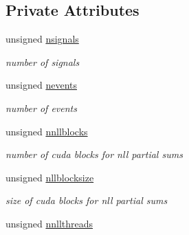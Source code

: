 \subsection*{Private Attributes}
\begin{DoxyCompactItemize}
\item 
\hypertarget{classMCMC_a417ddd0a6fdee2ea401d3d1ac727171a}{
unsigned \hyperlink{classMCMC_a417ddd0a6fdee2ea401d3d1ac727171a}{nsignals}}
\label{classMCMC_a417ddd0a6fdee2ea401d3d1ac727171a}

\begin{DoxyCompactList}\small\item\em number of signals \item\end{DoxyCompactList}\item 
\hypertarget{classMCMC_a65d836666d35f0c4ffb3f94b84082cbc}{
unsigned \hyperlink{classMCMC_a65d836666d35f0c4ffb3f94b84082cbc}{nevents}}
\label{classMCMC_a65d836666d35f0c4ffb3f94b84082cbc}

\begin{DoxyCompactList}\small\item\em number of events \item\end{DoxyCompactList}\item 
\hypertarget{classMCMC_a1da299776614208fe3cbd4b3e7dad36e}{
unsigned \hyperlink{classMCMC_a1da299776614208fe3cbd4b3e7dad36e}{nnllblocks}}
\label{classMCMC_a1da299776614208fe3cbd4b3e7dad36e}

\begin{DoxyCompactList}\small\item\em number of cuda blocks for nll partial sums \item\end{DoxyCompactList}\item 
\hypertarget{classMCMC_a52384b7e58b83ab2abd279071b08ad84}{
unsigned \hyperlink{classMCMC_a52384b7e58b83ab2abd279071b08ad84}{nllblocksize}}
\label{classMCMC_a52384b7e58b83ab2abd279071b08ad84}

\begin{DoxyCompactList}\small\item\em size of cuda blocks for nll partial sums \item\end{DoxyCompactList}\item 
\hypertarget{classMCMC_af09948388cb5534d9a563a943979eecd}{
unsigned \hyperlink{classMCMC_af09948388cb5534d9a563a943979eecd}{nnllthreads}}
\label{classMCMC_af09948388cb5534d9a563a943979eecd}


\end{DoxyCompactItemize}
